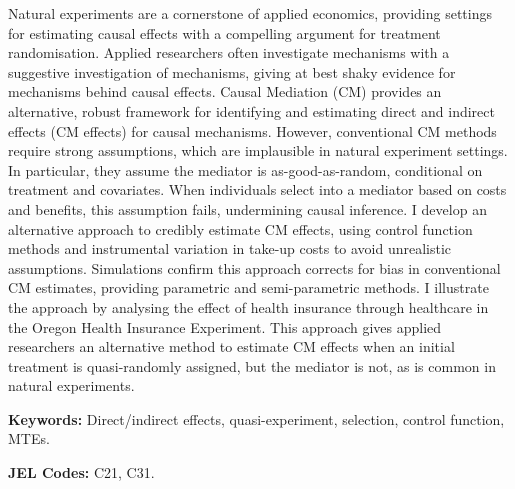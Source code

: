 \noindent
Natural experiments are a cornerstone of applied economics, providing settings for estimating causal effects with a compelling argument for treatment randomisation.
Applied researchers often investigate mechanisms with a suggestive investigation of mechanisms, giving at best shaky evidence for mechanisms behind causal effects.
Causal Mediation (CM) provides an alternative, robust framework for identifying and estimating direct and indirect effects (CM effects) for causal mechanisms.
However, conventional CM methods require strong assumptions, which are implausible in natural experiment settings.
In particular, they assume the mediator is as-good-as-random, conditional on treatment and covariates.
When individuals select into a mediator based on costs and benefits, this assumption fails, undermining causal inference.
I develop an alternative approach to credibly estimate CM effects, using control function methods and instrumental variation in take-up costs to avoid unrealistic assumptions.
Simulations confirm this approach corrects for bias in conventional CM estimates, providing parametric and semi-parametric methods.
I illustrate the approach by analysing the effect of health insurance through healthcare in the Oregon Health Insurance Experiment.
This approach gives applied researchers an alternative method to estimate CM effects when an initial treatment is quasi-randomly assigned, but the mediator is not, as is common in natural experiments.

\vspace{0.5cm}
\noindent
\textbf{Keywords:}
Direct/indirect effects, quasi-experiment, selection, control function, MTEs.

\vspace{0.1cm}
\noindent
\textbf{JEL Codes:}
C21, C31.
